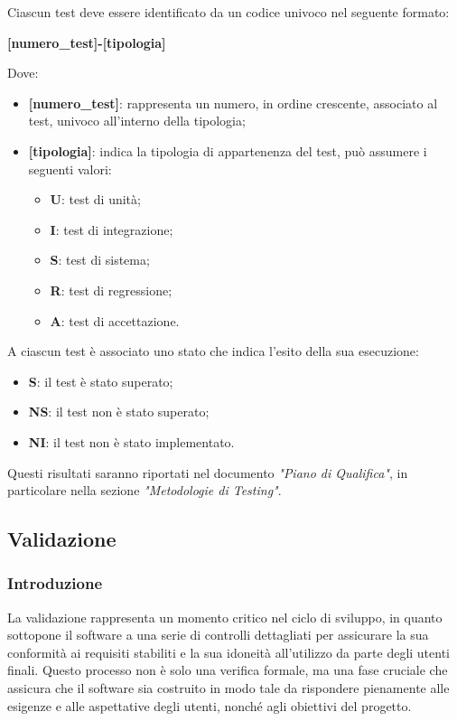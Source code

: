 Ciascun test deve essere identificato da un codice univoco nel seguente formato:
\begin{center}
	\textbf{[numero\_test]-[tipologia]}
\end{center}
Dove:
\begin{itemize}
	\item \textbf{[numero\_test]}: rappresenta un numero, in ordine crescente, associato al test, univoco all'interno della tipologia;
	\item \textbf{[tipologia]}: indica la tipologia di appartenenza del test, può assumere i seguenti valori:
	      \begin{itemize}
		      \item \textbf{U}: test di unità;
		      \item \textbf{I}: test di integrazione;
		      \item \textbf{S}: test di sistema;
		      \item \textbf{R}: test di regressione;
		      \item \textbf{A}: test di accettazione.
	      \end{itemize}

\end{itemize}

A ciascun test è associato uno stato che indica l'esito della sua esecuzione:
\begin{itemize}
	\item \textbf{S}: il test è stato superato;
	\item \textbf{NS}: il test non è stato superato;
	\item \textbf{NI}: il test non è stato implementato.
\end{itemize}
Questi risultati saranno riportati nel documento \textit{"Piano di Qualifica"}, in particolare nella sezione \textit{"Metodologie di Testing"}.

\subsection{Validazione}
\subsubsection{Introduzione}
La validazione rappresenta un momento critico nel ciclo di sviluppo, in quanto sottopone il software a una serie di controlli dettagliati per assicurare la sua conformità ai requisiti stabiliti e la sua idoneità all'utilizzo da parte degli utenti finali. Questo processo non è solo una verifica formale, ma una fase cruciale che assicura che il software sia costruito in modo tale da rispondere pienamente alle esigenze e alle aspettative degli utenti, nonché agli obiettivi del progetto.

